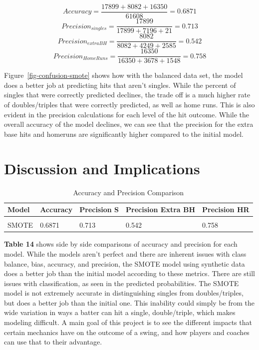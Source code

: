 \documentclass[
  letterpaper,
  DIV=11,
  numbers=noendperiod]{scrartcl}
\begin{document}
\[ Accuracy = \frac{17899 + 8082 + 16350}{61608} = 0.6871\]
\[Precision_{singles} = \frac{17899}{17899 + 7196 + 21} = 0.713\]
\[Precision_{extraBH} = \frac{8082}{8082 + 4249 + 2585} = 0.542\]
\[Precision_{HomeRuns} = \frac{16350}{16350 + 3678 + 1548} = 0.758\]

Figure~\ref{fig-confusion-smote} shows how with the balanced data set,
the model does a better job at predicting hits that aren't singles.
While the percent of singles that were correctly predicted declines, the
trade off is a much higher rate of doubles/triples that were correctly
predicted, as well as home runs. This is also evident in the precision
calculations for each level of the hit outcome. While the overall
accuracy of the model declines, we can see that the precision for the
extra base hits and homeruns are significantly higher compared to the
initial model.

\section{Discussion and Implications}\label{discussion-and-implications}

\begin{table}[!h]
\centering
\caption{\label{tab:unnamed-chunk-70}Accuracy and Precision Comparison}
\centering
\begin{tabular}[t]{lllll}
\toprule
Model & Accuracy & Precision S & Precision Extra BH & Precision HR\\
\midrule
\cellcolor{gray!10}{Initial} & \cellcolor{gray!10}{0.7182} & \cellcolor{gray!10}{0.736} & \cellcolor{gray!10}{0.418} & \cellcolor{gray!10}{0.641}\\
SMOTE & 0.6871 & 0.713 & 0.542 & 0.758\\
\bottomrule
\end{tabular}
\end{table}

\textbf{Table 14} shows side by side comparisons of accuracy and
precision for each model. While the models aren't perfect and there are
inherent issues with class balance, bias, accuracy, and precision, the
SMOTE model using synthetic data does a better job than the initial
model according to these metrics. There are still issues with
classification, as seen in the predicted probabilities. The SMOTE model
is not extremely accurate in distinguishing singles from
doubles/triples, but does a better job than the initial one. This
inability could simply be from the wide variation in ways a batter can
hit a single, double/triple, which makes modeling difficult. A main goal
of this project is to see the different impacts that certain mechanics
have on the outcome of a swing, and how players and coaches can use that
to their advantage.
\end{document}
